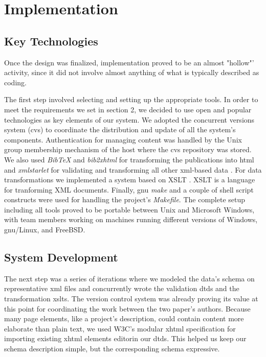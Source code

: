 \documentclass[10pt]{article}
\begin{document}
\section{Implementation}

\subsection{Key Technologies}

Once the design was finalized,
implementation proved to be an almost "hollow"' activity,
since it did not involve almost anything of what
is typically described as coding.

The first step involved selecting and setting up the
appropriate tools. In order to meet the requirements we set in section 2, 
we decided to use open and popular
technologies as key elements of our system.
We adopted the concurrent versions system
({\sc cvs}) \cite{BF01} \cite{CVS} to coordinate the distribution
and update of all the system's components.
Authentication for managing content was handled by the
Unix group membership mechanism of the host where the
{\sc cvs} repository was stored.
We also used
{\em BibTeX} \cite{Pa88} and {\em bib2xhtml} \cite{BibXHMTL} for transforming the publications
into {\sc html} and
{\em xmlstarlet} \cite{Gru04} for validating and transforming
all other {\sc xml}-based data \cite{W3C_XML}.
For data transformations we 
implemented a system based on XSLT \cite{W3C_XSLT}. XSLT is a language for tranforming XML documents.
Finally, {\sc gnu} {\em make} \cite{gnu_make} and a couple of shell script
constructs were used for handling the project's {\em Makefile}.
The complete setup including all tools proved to be portable
between Unix and Microsoft Windows, with team members working
on machines running different versions of Windows, {\sc gnu}/Linux,
and Free{\sc BSD}.

\subsection{System Development}

The next step was a series of iterations where we
modeled the data's schema on representative {\sc xml}
files and concurrently wrote the validation {\sc dtd}s
and the transformation {\sc xslt}s.
The version control system was already proving its value
at this point
for coordinating the work between the two paper's authors.
Because many page elements, like a project's description,
could contain content more elaborate than plain text,
we used W3C's modular {\sc xhtml} specification for
importing existing {\sc xhtml} elements editorin our {\sc dtd}s.
This helped us keep our schema description simple,
but the corresponding schema expressive.
\end{document}
